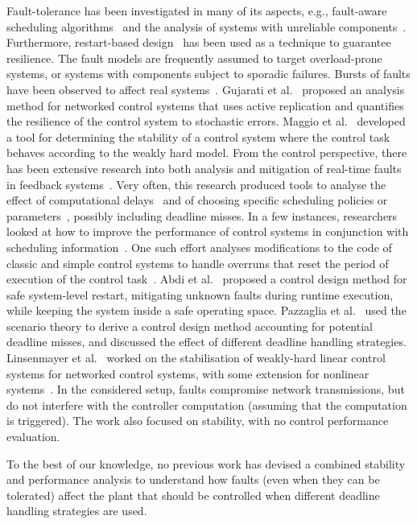 Fault-tolerance has been investigated in
many of its aspects, e.g., fault-aware scheduling 
algorithms~\cite{Rowe:2013, Buttazzo:2000b} and the analysis of systems with unreliable components~\cite{Teich:2015}. Furthermore, 
restart-based design~\cite{Caccamo:2017a, Caccamo:2018} has been used as a technique to guarantee resilience. The fault models are frequently assumed to target overload-prone 
systems, or systems with components subject to sporadic failures. Bursts of faults have been observed to affect real systems~\cite{Phan:2015, Vreman:2020}.
Gujarati et al.~\cite{Gujarati:2018} proposed an analysis 
method for networked control systems that uses active replication and quantifies the resilience of the control
system to stochastic errors. 
Maggio et al.~\cite{Maggio:2020} developed a tool for determining the stability of a control system where the control task behaves according to the weakly hard 
model. From the control perspective, there has been extensive research into both analysis and mitigation of real-time faults in feedback systems~\cite{Ramanathan:1997, Chakraborty:2014b, Chakraborty:2018}. Very often, this research produced tools to analyse the effect of computational delays~\cite{Cervin:2019} and of choosing specific scheduling policies or parameters~\cite{Palopoli:2000, Cervin:2005}, possibly including deadline misses. In a few instances, researchers looked at how to improve the performance of control systems in conjunction with scheduling information~\cite{Buttazzo:2007}. One such effort analyses modifications to the code of classic and simple control systems to handle overruns that reset the period of execution of the control task~\cite{Pazzaglia:2021}.
Abdi et al.~\cite{Caccamo:2017b} proposed a control design method for safe system-level restart, mitigating 
unknown faults during runtime execution, while keeping the system inside a safe operating space. 
Pazzaglia et al.~\cite{Pazzaglia:2019} used the scenario theory to derive a control design method accounting for potential 
deadline misses, and discussed the effect of different deadline handling strategies.
Linsenmayer et al.~\cite{Linsenmayer:2020} worked on the stabilisation of weakly-hard linear control systems for networked control systems, with some extension for nonlinear systems~\cite{Hertneck:2019}. In the considered setup, faults compromise network transmissions, but do not interfere with the controller computation (assuming that the computation is triggered). The work also focused on stability, with no control performance evaluation.

To the best of our knowledge, no previous work has devised a combined stability and performance analysis to understand how faults (even when they can be tolerated) affect the plant that should be controlled when different deadline handling strategies are used.

